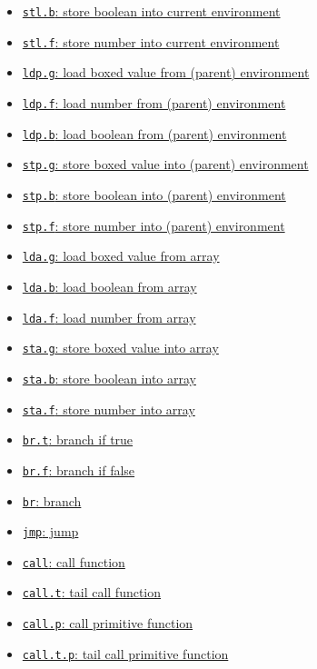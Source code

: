 \begin{itemize}
\begin{itemize}
\begin{itemize}
{store boxed value into current environment}
\item \hyperref[sec:org711619f]{\texttt{stl.b}: store
boolean into current environment}
\item \hyperref[sec:org29b23b4]{\texttt{stl.f}: store
number into current environment}
\item \hyperref[sec:org445285b]{\texttt{ldp.g}: load
boxed value from (parent) environment}
\item \hyperref[sec:orgf48099d]{\texttt{ldp.f}: load
number from (parent) environment}
\item \hyperref[sec:org74003ff]{\texttt{ldp.b}: load
boolean from (parent) environment}
\item \hyperref[sec:org3861b91]{\texttt{stp.g}:
store boxed value into (parent) environment}
\item \hyperref[sec:org15feb28]{\texttt{stp.b}: store
boolean into (parent) environment}
\item \hyperref[sec:org4696eef]{\texttt{stp.f}: store
number into (parent) environment}
\item \hyperref[sec:org0b3a1ff]{\texttt{lda.g}: load boxed value
from array}
\item \hyperref[sec:orgb1de169]{\texttt{lda.b}: load boolean from
array}
\item \hyperref[sec:orgdc8e9a7]{\texttt{lda.f}: load number from
array}
\item \hyperref[sec:org4724d89]{\texttt{sta.g}: store boxed value
into array}
\item \hyperref[sec:org8e9e3f6]{\texttt{sta.b}: store boolean into
array}
\item \hyperref[sec:org3dfaf54]{\texttt{sta.f}: store number into
array}
\item \hyperref[sec:orge20199f]{\texttt{br.t}: branch if true}
\item \hyperref[sec:org6c72b12]{\texttt{br.f}: branch if false}
\item \hyperref[sec:org71bb9a3]{\texttt{br}: branch}
\item \hyperref[sec:orgeb956da]{\texttt{jmp}: jump}
\item \hyperref[sec:orgc60978b]{\texttt{call}: call function}
\item \hyperref[sec:org026b562]{\texttt{call.t}: tail call function}
\item \hyperref[sec:org99bb90f]{\texttt{call.p}: call primitive
function}
\item \hyperref[sec:orgd22c74d]{\texttt{call.t.p}: tail call
primitive function}

\end{itemize}
\end{itemize}
\end{itemize}
